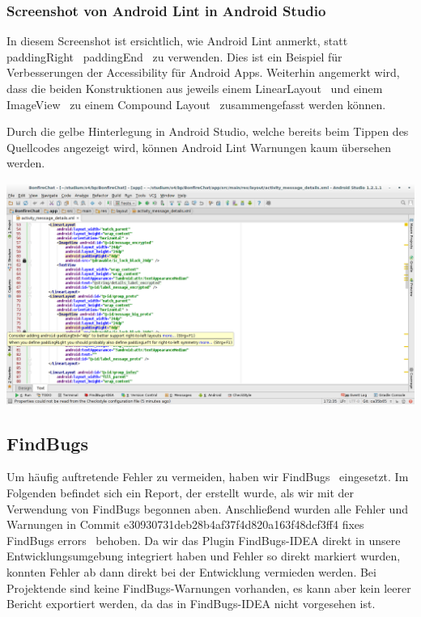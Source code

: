 

\subsubsection{Screenshot von Android Lint in Android Studio}

In diesem Screenshot ist ersichtlich, wie Android Lint anmerkt, statt \glqq paddingRight\grqq~ \glqq paddingEnd\grqq~ zu verwenden. Dies ist ein Beispiel für Verbesserungen der Accessibility für Android Apps. Weiterhin angemerkt wird, dass die beiden Konstruktionen aus jeweils einem \glqq LinearLayout\grqq~ und einem \glqq ImageView\grqq~ zu einem \glqq Compound Layout\grqq~ zusammengefasst werden können.

Durch die gelbe Hinterlegung in Android Studio, welche bereits beim Tippen des Quellcodes angezeigt wird, können Android Lint Warnungen kaum übersehen werden.

\includegraphics[width=17.5cm]{belege/lint/android-lint-screenshot.png}


\clearpage
\subsection{FindBugs}

Um häufig auftretende Fehler zu vermeiden, haben wir \glqq FindBugs\grqq~ eingesetzt. Im Folgenden befindet sich ein Report, der erstellt wurde, als wir mit der Verwendung von FindBugs begonnen aben. Anschließend wurden alle Fehler und Warnungen in Commit e30930731deb28b4af37f4d820a163f48dcf3ff4 \glqq fixes FindBugs errors\grqq~ behoben. Da wir das Plugin FindBugs-IDEA direkt in unsere Entwicklungsumgebung integriert haben und Fehler so direkt markiert wurden, konnten Fehler ab dann direkt bei der Entwicklung vermieden werden. Bei Projektende sind keine FindBugs-Warnungen vorhanden, es kann aber kein leerer Bericht exportiert werden, da das in FindBugs-IDEA nicht vorgesehen ist.

